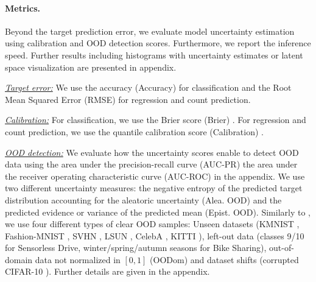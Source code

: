 \paragraph{Metrics.} Beyond the target prediction error, we evaluate model uncertainty estimation using calibration and OOD detection scores. Furthermore, we report the inference speed. Further results including histograms with uncertainty estimates or latent space visualization are presented in appendix. 

\textit{\underline{Target error:}} We use the accuracy (Accuracy) for classification and the Root Mean Squared Error (RMSE) for regression and count prediction. 

\textit{\underline{Calibration:}} For classification, we use the Brier score (Brier) \citep{scoring-rules}. For regression and count prediction, we use the quantile calibration score (Calibration) \citep{accurate-uncertainties-deep-learning-regression}. 

\textit{\underline{OOD detection:}} We evaluate how the uncertainty scores enable to detect OOD data using the area under the precision-recall curve (AUC-PR) the area under the receiver operating characteristic curve (AUC-ROC) in the appendix. We use two different uncertainty measures: the negative entropy of the predicted target distribution accounting for the aleatoric uncertainty (Alea. OOD) and the predicted evidence or variance of the predicted mean (Epist. OOD). Similarly to \citep{dataset-shift, charpentier2020}, we use four different types of clear OOD samples: Unseen datasets (KMNIST \cite{kmnist}, Fashion-MNIST \citep{fashionmnist}, SVHN \citep{svhn}, LSUN \citep{lsun}, CelebA \citep{celeba}, KITTI \citep{kitti}), left-out data (classes 9/10 for Sensorless Drive, winter/spring/autumn seasons for Bike Sharing), out-of-domain data not normalized in $[0, 1]$ (OODom) and dataset shifts (corrupted CIFAR-10 \citep{benchmarking-corruptions}). Further details are given in the appendix.

